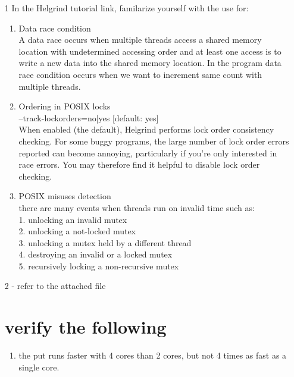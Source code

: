 \documentclass{sem5}
\author{Hemant Kumar}
\begin{document}
\begin{itemize}
\item[1] In the Helgrind tutorial link, familarize yourself with the use for: \\
\begin{enumerate}
\item Data race condition \\

 A data race occurs when multiple threads access a shared memory location with undetermined accessing order and at least one access is to write a new data into the shared memory location. 
In the program data race condition occurs when we want to increment same count with multiple threads. 


\item Ordering in POSIX locks \\

--track-lockorders=no|yes [default: yes] \\

When enabled (the default), Helgrind performs lock order consistency checking. For some buggy programs, the large number of lock order errors reported can become annoying, particularly if you're only interested in race errors. You may therefore find it helpful to disable lock order checking. 

\item POSIX misuses detection \\

there are many events when threads run on invalid time such as: \\
1. unlocking an invalid mutex \\
2. unlocking a not-locked mutex \\
3. unlocking a mutex held by a different thread \\ 
4. destroying an invalid or a locked mutex \\
5. recursively locking a non-recursive mutex\\

\end{enumerate}

\newpage
\item[2]- refer to the attached file\\
\section{verify the following}
\begin{enumerate}
\item  the put runs faster with 4 cores than 2 cores, but not 4 times as fast as a single core. \\


\end{enumerate}
\end{itemize}
\end{document}
